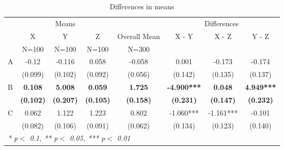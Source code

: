 

\begin{table}[!ht]
  \centering
  \caption{Differences in means}
  \label{table:differencesinmeans}
\begin{tabular}{lccccccc}
  \toprule
  \toprule
  & \multicolumn{3}{c}{Means} & \multicolumn{1}{c}{} & \multicolumn{3}{c}{Differences} \\
  \cmidrule(lr){2-4}\cmidrule(lr){6-8}
   &   X & Y & Z & Overall Mean & X - Y & X - Z & Y - Z\\
   & N=100 & N=100 & N=100 & N=300 &  &  & \\
  \midrule
  A & -0.12 & -0.116 & 0.058 & -0.058 & 0.001 & -0.173 & -0.174 \\
   & (0.099) & (0.102) & (0.092) & (0.056) & (0.142) & (0.135) & (0.137) \\
  B & \textbf{0.108} & \textbf{5.008} & \textbf{0.059} & \textbf{1.725} & \textbf{-4.900***} & \textbf{0.048} & \textbf{4.949***} \\
   & \textbf{(0.102)} & \textbf{(0.207)} & \textbf{(0.105)} & \textbf{(0.158)} & \textbf{(0.231)} & \textbf{(0.147)} & \textbf{(0.232)} \\
  C & 0.062 & 1.122 & 1.223 & 0.802 & -1.060*** & -1.161*** & -0.101 \\
   & (0.082) & (0.106) & (0.091) & (0.062) & (0.134) & (0.123) & (0.140) \\
  \bottomrule
  \multicolumn{8}{l}{{\small \textit{* p$<$ 0.1, ** p$<$ 0.05, *** p$<$ 0.01}}}\\
\end{tabular}
\end{table}
